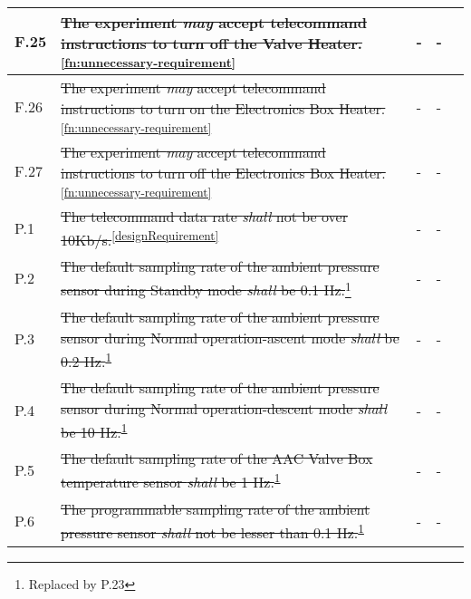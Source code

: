 \begin{longtable}[]{|m{}| m{} |m{} |m{}|m{}|}
F.25 & \st{The experiment \textit{may} accept telecommand instructions to turn off the Valve Heater.}\textsuperscript{\ref{fn:unnecessary-requirement}}                                                                                         &      -        & -            &        \\ \hline
F.26 & \st{The experiment \textit{may} accept telecommand instructions to turn on the Electronics Box Heater.}\textsuperscript{\ref{fn:unnecessary-requirement}}                                                                                     &      -        & -            &        \\ \hline
F.27 & \st{The experiment \textit{may} accept telecommand instructions to turn off the Electronics Box Heater.}\textsuperscript{\ref{fn:unnecessary-requirement}}                                                                                    &      -        & -            &        \\ \hline
P.1  & \st{The telecommand data rate \textit{shall} not be over 10Kb/s.}\textsuperscript{\ref{designRequirement}}                                                                                                                           &        -      & -          &        \\ \hline
P.2  & \st{The default sampling rate of the ambient pressure sensor during Standby mode \textit{shall} be 0.1 Hz.}\footnote{Replaced by P.23\label{replaceSoftVeri}}                                                                       &      -  & -  &        \\ \hline
P.3  & \st{The default sampling rate of the ambient pressure sensor during Normal operation-ascent mode \textit{shall} be 0.2 Hz.}\textsuperscript{\ref{replaceSoftVeri}}                                                           &    -        & -        &        \\ \hline
P.4  & \st{The default sampling rate of the ambient pressure sensor during Normal operation-descent mode \textit{shall} be 10 Hz.}\textsuperscript{\ref{replaceSoftVeri}}                                                           &   -     & -    &        \\ \hline
P.5  & \st{The default sampling rate of the AAC Valve Box temperature sensor \textit{shall} be 1 Hz.}\textsuperscript{\ref{replaceSoftVeri}}                                                                                        &     -        &  -            &        \\ \hline
P.6  &\st{ The programmable sampling rate of the ambient pressure sensor \textit{shall} not be lesser than 0.1 Hz.}\textsuperscript{\ref{replaceSoftVeri}}                                                                          &      -    & -            &        \\ \hline

\end{longtable}
